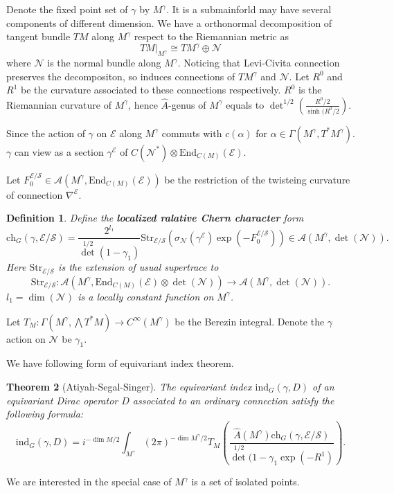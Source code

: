 \documentclass[12pt]{amsart}
\newtheorem{Thm}{Theorem}
\newtheorem{Def}[Thm]{Definition}
\def\cA{{\mathcal{A}}}
\def\cN{{\mathcal{N}}}
\def\cE{{\mathcal{E}}}
\def\cS{{\mathcal{S}}}
\def\End{{\mathrm{End}}}
\def\Str{{\mathrm{Str}}}
\def\kw#1{{\bf \em #1}}
\def\ch{\mathrm{ch}}
\def\Ah{{\hat{A}}}
\def\ind{\mathrm{ind}}
\def\Mr{M^{\gamma}}
\begin{document}
Denote the fixed point set of $\gamma$ by $M^\gamma$. It is a submainforld 
may have several components of different dimension. We have a orthonormal
decomposition
of tangent bundle $TM$ along $M^\gamma$ respect to the Riemannian metric as
\[
TM|_{M^\gamma} \cong T\Mr \oplus \cN
\]
where $\cN$ is the normal bundle along $\Mr$. 
Noticing that Levi-Civita connection preserves the decompositon, so 
induces connections of $T\Mr$ and $\cN$. Let $R^0$ and $R^1$ be the curvature
associated to these connections respectively. $R^0$ is the Riemannian curvature
of $M^\gamma$, 
hence $\Ah$-genus of $M^\gamma$ 
equals to $\det^{1/2}\left(\frac{R^0/2}{\sinh(R^0/2}\right)$.

Since the action of $\gamma$ on $\cE$ along $M^\gamma$ commuts with 
$c(\alpha)$ for $\alpha\in \Gamma(\Mr,T^*\Mr)$. $\gamma$ can view as a 
section $\gamma^\cE$ of $C(\cN^*)\otimes \End_{C(M)}(\cE)$.

Let $F_0^{\cE/\cS}\in \cA(M^\gamma,\End_{C(M)}(\cE))$ be the restriction of the twisteing curvature of
connection $\nabla^\cE$. 
\begin{Def}
Define the \kw{localized ralative Chern character} form
\[
\ch_G(\gamma, \cE/\cS) = \frac{2^{l_1}}{\det^{1/2}(1-\gamma_1)}
\Str_{\cE/\cS}(\sigma_{\cN}(\gamma^\cE)\exp(-F_0^{\cE/\cS})) \in \cA(M^\gamma,\det(\cN)).
\]
Here $\Str_{\cE/\cS}$ is the extension of usual supertrace to 
\[
\Str_{\cE/\cS}\colon \cA(\Mr, \End_{C(M)}(\cE)\otimes \det(\cN))
\to \cA(\Mr,\det(\cN)).
\]
$l_1 = \dim(\cN)$ is a locally constant function on $\Mr$. 
\end{Def}

Let $T_M\colon \Gamma(\Mr, \bigwedge T^*M) \to C^{\infty}(\Mr)$ be the 
Berezin integral. Denote the $\gamma$ action on $\cN$ be $\gamma_1$.

We have following form of equivariant index theorem.
\begin{Thm}[Atiyah-Segal-Singer]
The equivariant index $\ind_G(\gamma,D)$ of an equivariant Dirac operator $D$
associated to an ordinary connection satisfy the following formula:
\begin{equation}\label{eq:fixed}
\ind_G(\gamma, D) = i^{-\dim M/2}\int_{\Mr}(2\pi)^{-\dim \Mr/2} T_M
\left(\frac{\Ah(\Mr)\ch_G(\gamma,\cE/\cS)}{\det^{1/2}
(1-\gamma_1\exp(-R^1)}\right).
\end{equation}
\end{Thm}

We are interested in the special case of $\Mr$ is a set of isolated points.
\end{document}
